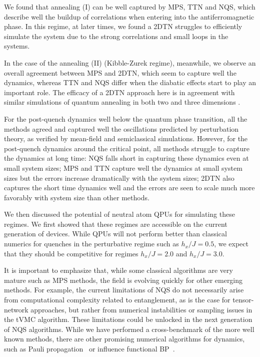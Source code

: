 \documentclass[aps,pra,reprint,amssymb,superscriptaddress]{revtex4-2}
\begin{document}
We found that annealing (I) can be well captured by MPS, TTN and NQS, which describe well the buildup of correlations when entering into the antiferromagnetic phase. In this regime, at later times, we found a 2DTN struggles to efficiently simulate the system due to the strong correlations and small loops in the systems.


In the case of the annealing (II) (Kibble-Zurek regime), meanwhile, we observe an overall agreement between MPS and 2DTN, which seem to capture well the dynamics, whereas TTN and NQS differ when the diabatic effects start to play an important role. The efficacy of a 2DTN approach here is in agreement with similar simulations of quantum annealing in both two and three dimensions \cite{tindall_dynamics_2025}.

For the post-quench dynamics well below the quantum phase transition, all the methods agreed and captured well the oscillations predicted by perturbation theory, as verified by mean-field and semiclassical simulations. However, for the post-quench dynamics around the critical point, all methods struggle to capture the dynamics at long time: NQS falls short in capturing these dynamics even at small system sizes; MPS and TTN capture well the dynamics at small system sizes but the errors increase dramatically with the system sizes; 2DTN also captures the short time dynamics well and the errors are seen to scale much more favorably with system size than other methods.

We then discussed the potential of neutral atom QPUs for simulating these regimes. We first showed that these regimes are  accessible on the current generation of devices. While QPUs will not perform better than classical numerics for quenches in the perturbative regime such as $h_x/J=0.5$, we expect that they should be competitive for regimes $h_x/J=2.0$ and $h_x/J=3.0$. 


It is important to emphasize that, while some classical algorithms are very mature such as MPS methods, the field is evolving quickly for other emerging methods. For example, the current limitations of NQS do not necessarily arise from computational complexity related to entanglement, as is the case for tensor-network approaches, but rather from numerical instabilities or sampling issues in the tVMC algorithm. These limitations could be unlocked in the next generation of NQS algorithms.  While we have performed a cross-benchmark of the more well known methods, there are other promising numerical algorithms for dynamics, such as Pauli propagation~\cite{begusic_real-time_2025,broers_exclusive-or_2024,broers_scalable_2025,rudolph_pauli_2025} or influence functional BP~\cite{abanin_colloquium_2019, lerose_influence_2021, park_simulating_2025}.
\end{document}
